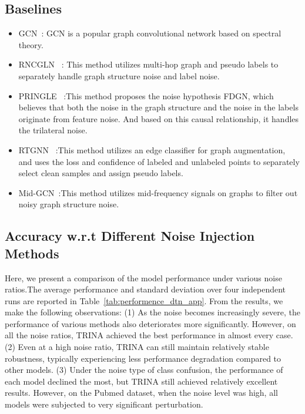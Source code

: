 \documentclass[sigconf, anonymous, review]{acmart}
\begin{document}
  \subsection{Baselines}
    \begin{itemize}
        \item GCN~\cite{kipf2016semi}: GCN is a popular graph convolutional network based on spectral theory.
        \item RNCGLN ~\cite{zhu2024robust}: This method utilizes multi-hop graph and pseudo labels to separately handle graph structure noise and label noise.
        \item PRINGLE ~\cite{in2024noise}:This method proposes the noise hypothesis FDGN, which believes that both the noise in the graph structure and the noise in the labels originate from feature noise. And based on this causal relationship, it handles the trilateral noise.
        \item RTGNN ~\cite{qian2023robust}:This method utilizes an edge classifier for graph augmentation, and uses the loss and confidence of labeled and unlabeled points to separately select clean samples and assign pseudo labels.
        \item Mid-GCN~\cite{huang2023robust}:This method utilizes mid-frequency signals on graphs to filter out noisy graph structure noise.
    \end{itemize}


  \subsection{Accuracy w.r.t Different Noise Injection Methods}
    Here, we present a comparison of the model performance under various noise ratios.The average performance and standard deviation over four independent runs are reported in Table~\ref{tab:performence_dtn_app}. From the results, we make the following observations:
    (1) As the noise becomes increasingly severe, the performance of various methods also deteriorates more significantly. However, on all the noise ratios, TRINA achieved the best performance in almost every case.
    (2) Even at a high noise ratio, TRINA can still maintain relatively stable robustness, typically experiencing less performance degradation compared to other models.
    (3) Under the noise type of class confusion, the performance of each model declined the most, but TRINA still achieved relatively excellent results. However, on the Pubmed dataset, when the noise level was high, all models were subjected to very significant perturbation.
\end{document}
